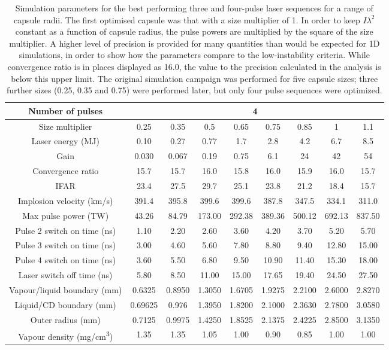 \begin{table}
{\begin{tabular}{|c|c|c|c|c|c|c|c|c|}
Number of pulses & \multicolumn{8}{c|}{4} \\
\hline
Size multiplier & 0.25 & 0.35 & 0.5 & 0.65 & 0.75 & 0.85 & 1 & 1.1 \\ 
\hline
Laser energy (MJ) & 0.10  & 0.27 & 0.77 & 1.7 & 2.8 & 4.2 & 6.7 & 8.5\\ 
Gain & 0.030 & 0.067 & 0.19 & 0.75 & 6.1 & 24 & 42 & 54\\ 
Convergence ratio & 15.7 & 15.7 & 16.0 & 15.8 & 16.0 & 15.9 & 16.0 & 15.7\\ 
IFAR & 23.4 & 27.5 & 29.7 & 25.1 & 23.8 & 21.2 & 18.4 & 15.7\\ 
Implosion velocity (km/s) & 391.4 & 395.8 & 399.6 & 399.6 & 387.8 & 347.5 & 334.1 & 311.0\\ 
Max pulse power (TW) & 43.26 & 84.79 & 173.00 & 292.38 & 389.36 &500.12 & 692.13 & 837.50\\ 
Pulse 2 switch on time (ns) & 1.10 & 2.20 & 2.60 & 3.60 & 4.20 & 3.70 & 5.20 & 5.70\\ 
Pulse 3 switch on time (ns) & 3.00 & 4.60 & 5.60 & 7.80 & 8.80 & 9.40 & 12.80 & 15.00\\ 
Pulse 4 switch on time (ns) & 3.60 & 5.50 & 6.80 & 9.50 & 10.90 & 11.40 & 15.30 & 18.00\\ 
Laser switch off time (ns) & 5.80 & 8.50 & 11.00 & 15.00 & 17.65 & 19.40 & 24.50 & 27.50\\ 
Vapour/liquid boundary (\si[per-mode=symbol]{\milli\meter}) & 0.6325 & 0.8950 & 1.3050 & 1.6705 & 1.9275 & 2.2100 & 2.6000 & 2.8270\\ 
Liquid/CD boundary (\si[per-mode=symbol]{\milli\meter}) & 0.69625 & 0.976 & 1.3950 & 1.8200 & 2.1000 & 2.3630 & 2.7800 & 3.0580\\ 
Outer radius (\si[per-mode=symbol]{\milli\meter}) & 0.7125 & 0.9975 & 1.4250 & 1.8525 & 2.1375 & 2.4225 & 2.8500 & 3.1350\\ 
Vapour density (\si[per-mode=symbol]{\milli\gram\per\centi\meter\cubed}) & 1.35 & 1.35 & 1.05 & 1.00 & 0.90 & 0.85 & 1.00 & 1.00\\
\hline
\end{tabular}}
\caption{Simulation parameters for the best performing three and four-pulse laser sequences for a range of capsule radii. The first optimised capsule was that with a size multiplier of 1. In order to keep $I\lambda^2$ constant as a function of capsule radius, the pulse powers are multiplied by the square of the size multiplier. A higher level of precision is provided for many quantities than would be expected for 1D simulations, in order to show how the parameters compare to the low-instability criteria. While convergence ratio is in places displayed as 16.0, the value to the precision calculated in the analysis is below this upper limit. The original simulation campaign was performed for five capsule sizes; three further sizes (0.25, 0.35 and 0.75) were performed later, but only four pulse sequences were optimized.}
\label{tab:ThirdHarmonic}
\end{table}

